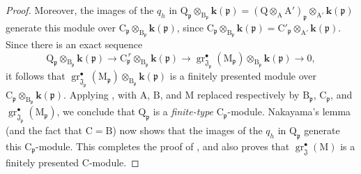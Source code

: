 \begin{proof}
Moreover, the images of the $q_h$ in $\mathrm{Q}_\mathfrak{p}\otimes_{\mathrm{B}_\mathfrak{p}}\boldsymbol{k}(\mathfrak{p})
=
(\mathrm{Q}\otimes_\mathrm{A}\mathrm{A}')_\mathfrak{p}
\otimes_{\mathrm{A}'}\boldsymbol{k}(\mathfrak{p})$
generate this module over $\mathrm{C}_\mathfrak{p}\otimes_{\mathrm{B}_\mathfrak{p}}\boldsymbol{k}(\mathfrak{p})$, since $\mathrm{C}_\mathfrak{p}\otimes_{\mathrm{B}_\mathfrak{p}}\boldsymbol{k}(\mathfrak{p})
=
\mathrm{C}'_\mathfrak{p}\otimes_{\mathrm{A}'}\boldsymbol{k}(\mathfrak{p})$.
Since there is an exact sequence
\[
  \mathrm{Q}_\mathfrak{p}\otimes_{\mathrm{B}_\mathfrak{p}}\boldsymbol{k}(\mathfrak{p})
  \longrightarrow
  \mathrm{C}_\mathfrak{p}^{\,r}\otimes_{\mathrm{B}_\mathfrak{p}}\boldsymbol{k}(\mathfrak{p})
  \longrightarrow
  \operatorname{gr}^\bullet_{\mathfrak{J}_\mathfrak{p}}(\mathrm{M}_\mathfrak{p})
  \otimes_{\mathrm{B}_\mathfrak{p}}\boldsymbol{k}(\mathfrak{p})
  \longrightarrow 0,
\]
it follows that $\operatorname{gr}^\bullet_{\mathfrak{J}_\mathfrak{p}}(\mathrm{M}_\mathfrak{p})\otimes_{\mathrm{B}_\mathfrak{p}}\boldsymbol{k}(\mathfrak{p})$ is a finitely presented module over $\mathrm{C}_\mathfrak{p}\otimes_{\mathrm{B}_\mathfrak{p}}\boldsymbol{k}(\mathfrak{p})$. Applying , with $\mathrm{A}$, $\mathrm{B}$, and $\mathrm{M}$ replaced respectively by $\mathrm{B}_\mathfrak{p}$, $\mathrm{C}_\mathfrak{p}$, and $\operatorname{gr}^\bullet_{\mathfrak{J}_\mathfrak{p}}(\mathrm{M}_\mathfrak{p})$, we conclude that $\mathrm{Q}_\mathfrak{p}$ is a \emph{finite-type} $\mathrm{C}_\mathfrak{p}$-module. Nakayama's lemma (and the fact that $\mathrm{C}=\mathrm{B}$) now shows that the images of the $q_h$ in $\mathrm{Q}_\mathfrak{p}$ generate this $\mathrm{C}_\mathfrak{p}$-module. This completes the proof of , and also proves that $\operatorname{gr}^\bullet_\mathfrak{J}(\mathrm{M})$ is a finitely presented $\mathrm{C}$-module.


\end{proof}
